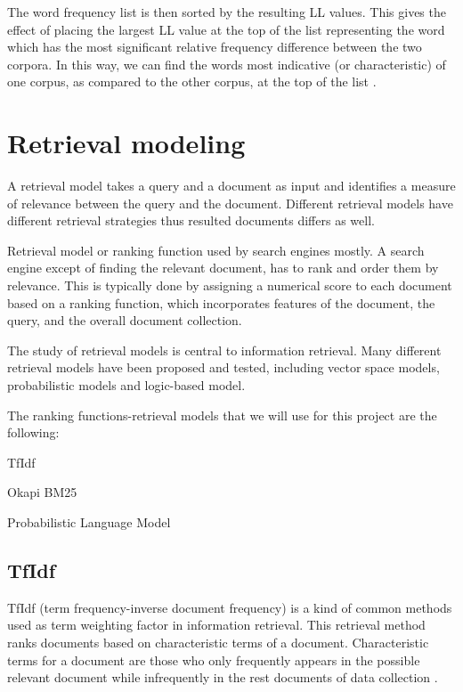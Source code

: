The word frequency list is then sorted by the resulting LL values. This gives the effect of placing the largest LL value at the top of the list representing the word which has the most significant relative frequency difference between the two corpora. In this way, we can find the words most indicative (or characteristic) of one corpus, as compared to the other corpus, at the top of the list \cite{RaysonGarside}.


\section{Retrieval modeling}

A retrieval model takes a query and a document as input and identifies a measure of relevance between the query and the document. Different retrieval models have different retrieval strategies thus resulted documents differs as well.

Retrieval model or ranking function used by search engines mostly. A search engine except of finding the relevant document, has to rank and order them by relevance. This is typically done by assigning a numerical score to each document based on a ranking function, which incorporates features of the document, the query, and the overall document collection.

The study of retrieval models is central to information retrieval. Many different retrieval models have been proposed and tested, including vector space models, probabilistic models and logic-based model.

The ranking functions-retrieval models that we will use for this project are the following:
\begin{list}{.}{}
\item TfIdf
\item Okapi BM25
\item Probabilistic Language Model
\end{list}

\subsection{TfIdf}

TfIdf (term frequency-inverse document frequency) is a kind of common methods used as term weighting factor in information retrieval. This retrieval method ranks documents based on characteristic terms of a document. Characteristic terms for a document are those who only frequently appears in the possible relevant document while infrequently in the rest documents of data collection \cite{ShouningSujuanYan}.

